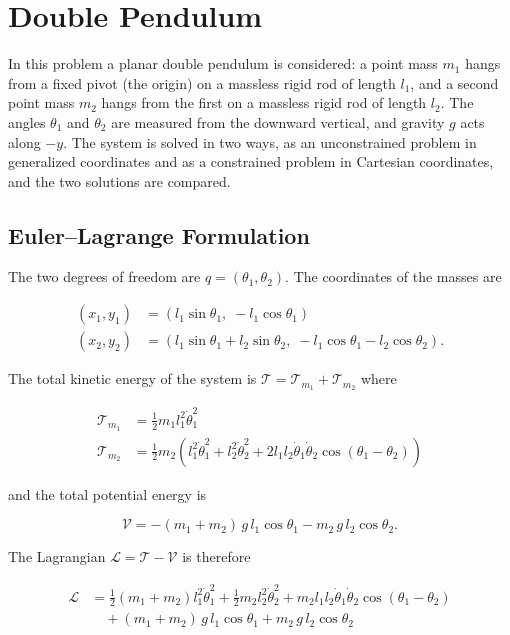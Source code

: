 \section{Double Pendulum}

In this problem a planar double pendulum is considered: a point mass $m_1$ hangs from a fixed pivot (the origin) on a massless rigid rod of length $l_1$, and a second point mass $m_2$ hangs from the first on a massless rigid rod of length $l_2$. The angles $\theta_1$ and $\theta_2$ are measured from the downward vertical, and gravity $g$ acts along $-y$. The system is solved in two ways, as an unconstrained problem in generalized coordinates and as a constrained problem in Cartesian coordinates, and the two solutions are compared.

\subsection{Euler--Lagrange Formulation}

The two degrees of freedom are $q = (\theta_1, \theta_2)$. The coordinates of the masses are

\begin{align}
    (x_1, y_1) &= \left( l_1\sin\theta_1,\; -l_1\cos\theta_1 \right) \\
    (x_2, y_2) &= \left( l_1\sin\theta_1 + l_2\sin\theta_2,\; -l_1\cos\theta_1 - l_2\cos\theta_2 \right).
\end{align}

The total kinetic energy of the system is $\mathcal{T} = \mathcal{T}_{m_1} + \mathcal{T}_{m_2}$ where

\begin{align}
    \mathcal{T}_{m_1} &= \frac{1}{2}m_1 l_1^2\dot\theta_1^2 \\
    \mathcal{T}_{m_2} &= \frac{1}{2}m_2\left( l_1^2\dot\theta_1^2 + l_2^2\dot\theta_2^2 + 2l_1l_2\dot\theta_1\dot\theta_2\cos(\theta_1-\theta_2) \right)
\end{align}

and the total potential energy is

\begin{equation}
    \mathcal{V} = -(m_1+m_2)\,g\,l_1\cos\theta_1 - m_2\,g\,l_2\cos\theta_2.
\end{equation}

The Lagrangian $\mathcal{L} = \mathcal{T} - \mathcal{V}$ is therefore

\begin{align}
    \mathcal{L} &= \frac{1}{2}(m_1+m_2)l_1^2\dot\theta_1^2 + \frac{1}{2}m_2l_2^2\dot\theta_2^2 + m_2l_1l_2\dot\theta_1\dot\theta_2\cos(\theta_1-\theta_2) \nonumber \\
&\quad + (m_1+m_2)\,g\,l_1\cos\theta_1 + m_2\,g\,l_2\cos\theta_2
\end{align}

